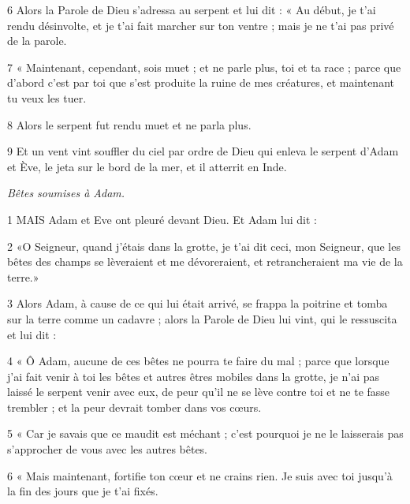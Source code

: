 \par 6 Alors la Parole de Dieu s'adressa au serpent et lui dit : « Au début, je t'ai rendu désinvolte, et je t'ai fait marcher sur ton ventre ; mais je ne t'ai pas privé de la parole.

\par 7 « Maintenant, cependant, sois muet ; et ne parle plus, toi et ta race ; parce que d’abord c’est par toi que s’est produite la ruine de mes créatures, et maintenant tu veux les tuer.

\par 8 Alors le serpent fut rendu muet et ne parla plus.

\par 9 Et un vent vint souffler du ciel par ordre de Dieu qui enleva le serpent d'Adam et Ève, le jeta sur le bord de la mer, et il atterrit en Inde.


\par \textit{Bêtes soumises à Adam.}

\par 1 MAIS Adam et Eve ont pleuré devant Dieu. Et Adam lui dit :

\par 2 «O Seigneur, quand j'étais dans la grotte, je t'ai dit ceci, mon Seigneur, que les bêtes des champs se lèveraient et me dévoreraient, et retrancheraient ma vie de la terre.»

\par 3 Alors Adam, à cause de ce qui lui était arrivé, se frappa la poitrine et tomba sur la terre comme un cadavre ; alors la Parole de Dieu lui vint, qui le ressuscita et lui dit :

\par 4 « Ô Adam, aucune de ces bêtes ne pourra te faire du mal ; parce que lorsque j'ai fait venir à toi les bêtes et autres êtres mobiles dans la grotte, je n'ai pas laissé le serpent venir avec eux, de peur qu'il ne se lève contre toi et ne te fasse trembler ; et la peur devrait tomber dans vos cœurs.

\par 5 « Car je savais que ce maudit est méchant ; c'est pourquoi je ne le laisserais pas s'approcher de vous avec les autres bêtes.

\par 6 « Mais maintenant, fortifie ton cœur et ne crains rien. Je suis avec toi jusqu'à la fin des jours que je t'ai fixés.


